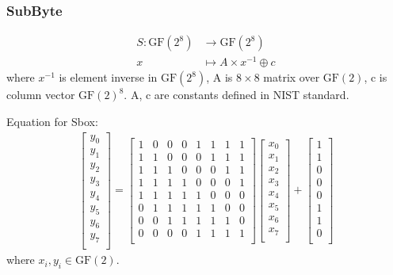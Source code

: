 \documentclass[11pt,oneside,final]{fithesis2}
\begin{document}
	\subsubsection*{SubByte}
	\begin{align}
	S: \text{GF}(2^8) & \longrightarrow  \text{GF}(2^8)\\
	x               & \longmapsto A \times x^{-1} \oplus c
	\end{align}
	where $x^{-1}$ is element inverse in $\text{GF}(2^8)$, A is $8 \times 8$ matrix over $\text{GF}(2)$, c is column vector $\text{GF}(2)^8$. A, c are constants defined in NIST standard.

	Equation for Sbox:
	\begin{align}
		\begin{bmatrix}
		    y_0\\
		    y_1\\
		    y_2\\
		    y_3\\
		    y_4\\
		    y_5\\
		    y_6\\
		    y_7\\
		\end{bmatrix}
		    =
		\begin{bmatrix}
		    1 & 0 & 0 & 0 & 1 & 1 & 1 & 1 \\
		    1 & 1 & 0 & 0 & 0 & 1 & 1 & 1 \\
		    1 & 1 & 1 & 0 & 0 & 0 & 1 & 1 \\
		    1 & 1 & 1 & 1 & 0 & 0 & 0 & 1 \\
		    1 & 1 & 1 & 1 & 1 & 0 & 0 & 0 \\
		    0 & 1 & 1 & 1 & 1 & 1 & 0 & 0 \\
		    0 & 0 & 1 & 1 & 1 & 1 & 1 & 0 \\
		    0 & 0 & 0 & 0 & 1 & 1 & 1 & 1 \\
		\end{bmatrix}
		\begin{bmatrix}
		    x_0\\
		    x_1\\
		    x_2\\
		    x_3\\
		    x_4\\
		    x_5\\
		    x_6\\
		    x_7\\
		\end{bmatrix}
		    +
		\begin{bmatrix}
		    1\\
		    1\\
		    0\\
		    0\\
		    0\\
		    1\\
		    1\\
		    0\\
		\end{bmatrix}
	    \end{align}
	where $x_i, y_i \in \text{GF}(2)$.
\end{document}
